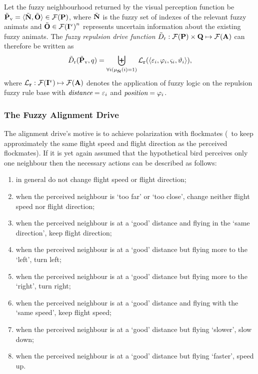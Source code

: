 \begin{defn}
\label{def:fuzzyAnimat:Dr:afd} 
Let the fuzzy neighbourhood returned by the visual perception function be ${\tilde{{\mathbf{P}}}}_\mathrm{v}=\langle {\ensuremath{\tilde{{\mathbf{N}}}}}, {\tilde{{\mathbf{O}}}} \rangle \in {\ensuremath{\mathcal{F}({\mathbf{P}})}}$, where ${\tilde{{\mathbf{N}}}}$ is the fuzzy set of indexes of the relevant fuzzy animats and ${\tilde{{\mathbf{O}}}} \in {\ensuremath{\mathcal{F}({\mathbf{I}}^\mathrm{v})}}^n$ represents uncertain information about the existing fuzzy animats. The \emph{fuzzy repulsion drive function} ${\tilde{D}}_\mathrm{r}:{\mathcal{F}({\mathbf{P}})} \times {\ensuremath{\mathbf{Q}}} \mapsto {\ensuremath{\mathcal{F}({\mathbf{A}})}}$ can therefore be written as
\begin{equation}
\ffunc{D}_\mathrm{r}(\fset{P}_\mathrm{v},q)=%
 \biguplus_{\forall i(\mu_\fset{N}(i)=1)} \mathcal{L}_\texttt{r}(\langle \varepsilon_i, \varphi_i, \varsigma_i, \vartheta_i \rangle),
\end{equation}
where $\mathcal{L}_\texttt{r}: {\mathcal{F}({\mathbf{I}}^\mathrm{v})} \mapsto {\ensuremath{\mathcal{F}({\mathbf{A}})}}$ denotes the application of fuzzy logic on the repulsion fuzzy rule base with $\emph{distance}=\varepsilon_i$ and $\emph{position}=\varphi_i$.
\end{defn}

\subsubsection{The Fuzzy Alignment Drive}
The alignment drive's motive is to achieve polarization with flockmates (\ie\ to keep approximately the same flight speed and flight direction as the perceived flockmates). If it is yet again assumed that the hypothetical bird perceives only one neighbour then the necessary actions can be described as follows:

\begin{enumerate}
\item in general do not change flight speed or flight direction;
\item when the perceived neighbour is `too far' or `too close', change neither flight speed nor flight direction;
\item when the perceived neighbour is at a `good' distance and flying in the `same direction', keep flight direction;
\item when the perceived neighbour is at a `good' distance but flying more to the `left', turn left;
\item when the perceived neighbour is at a `good' distance but flying more to the `right', turn right;
\item when the perceived neighbour is at a `good' distance and flying with the `same speed', keep flight speed;
\item when the perceived neighbour is at a `good' distance but flying `slower', slow down;
\item when the perceived neighbour is at a `good' distance but flying `faster', speed up.
\end{enumerate}

